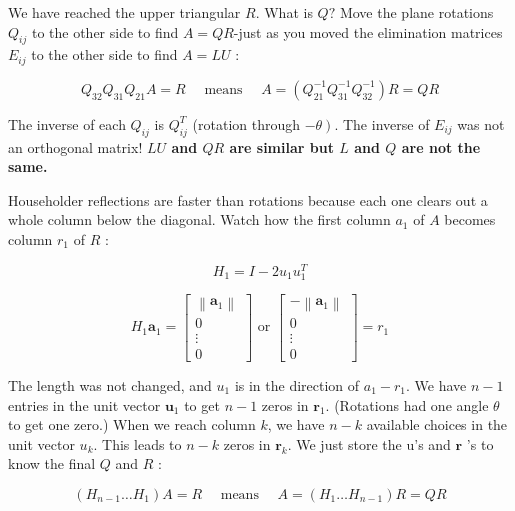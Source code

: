 \begin{example}[使用Givens进行QR分解]
    We have reached the upper triangular $R$. What is $Q ?$ Move the plane rotations $Q_{i j}$ to the other side to find $A=Q R$-just as you moved the elimination matrices $E_{i j}$ to the other side to find $A=L U$ :

    \begin{theorem}
      $$
    Q_{32} Q_{31} Q_{21} A=R \quad \text { means } \quad A=\left(Q_{21}^{-1} Q_{31}^{-1} Q_{32}^{-1}\right) R=Q R
    $$  
    \end{theorem}
    
    The inverse of each $Q_{i j}$ is $Q_{i j}^{ {T}}$ (rotation through $\left.-\theta\right)$. The inverse of $E_{i j}$ was not an orthogonal matrix! \textbf{$L U$ and $Q R$ are similar but $L$ and $Q$ are not the same.}
\end{example}

Householder reflections are faster than rotations because each one clears out a whole column below the diagonal. Watch how the first column $a_{1}$ of $A$ becomes column $r_{1}$ of $R$ :

\begin{example}[Reflection by $H_1$]
    $$H_1 = I - 2 u_1 u_1^T$$

    $$H_{1} \boldsymbol{a}_{1}=\left[\begin{array}{c}
        \left\|\boldsymbol{a}_{1}\right\| \\
        0 \\
        \vdots \\
        0
        \end{array}\right] \text { or }\left[\begin{array}{c}
        -\left\|\boldsymbol{a}_{1}\right\| \\
        0 \\
        \vdots \\
        0
        \end{array}\right]=r_{1}$$


The length was not changed, and $u_{1}$ is in the direction of $a_{1}-r_{1}$. We have $n-1$ entries in the unit vector $\boldsymbol{u}_{1}$ to get $n-1$ zeros in $\boldsymbol{r}_{1}$. (Rotations had one angle $\theta$ to get one zero.) When we reach column $k$, we have $n-k$ available choices in the unit vector $u_{k}$. This leads to $n-k$ zeros in $\boldsymbol{r}_{k}$. We just store the u's and $\boldsymbol{r}$ 's to know the final $Q$ and $R$ :

\begin{theorem}[$H$的逆是它本身]
    $$
\left(H_{n-1} \ldots H_{1}\right) A=R \quad \text { means }  \quad A=\left(H_{1} \ldots H_{n-1}\right) R=Q R
$$
\end{theorem}

\end{example}


